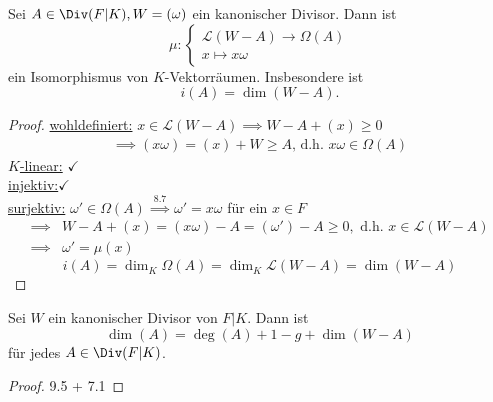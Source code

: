 \begin{satz}
    Sei $A \in \Div(F|K), W = (\omega)$ ein kanonischer Divisor.
    Dann ist
    $$ \mu: \begin{cases}
        \mathcal{L}(W-A) \to \Omega(A)\\
        x \mapsto x\omega
    \end{cases}$$
    ein Isomorphismus von $K$-Vektorräumen.
    Insbesondere ist $$i(A) = \dim (W-A).$$
\end{satz}
\begin{proof}
    \underline{wohldefiniert:} $x \in \mathcal{L}(W-A) \implies W-A + (x) \geq 0$
    \begin{align*}
        \implies (x\omega) = (x) + W \geq A \text{, d.h. } x\omega\in\Omega(A)
    \end{align*}
    \underline{$K$-linear:} $\checkmark$\\
    \underline{injektiv:}$\checkmark$\\
    \underline{surjektiv:} $\omega'\in\Omega(A) \stackrel{8.7}{\implies} \omega'=x\omega$ für ein $x \in F$
    \begin{align*}
        \implies& W-A + (x) = (x\omega) - A = (\omega') -A \geq 0, \text{ d.h. } x \in \mathcal{L}(W-A)\\
        \implies& \omega' = \mu(x)
    \end{align*}
    $$ i(A) = \dim_K\Omega(A) = \dim_K \mathcal{L}(W-A) = \dim (W-A)$$
\end{proof}

\begin{theorem}
    Sei $W$ ein kanonischer Divisor von $F|K$. Dann ist
    $$ \dim (A) = \deg (A) + 1 - g + \dim (W-A)$$
    für jedes $A \in \Div(F|K)$.
\end{theorem}
\begin{proof}
    9.5 + 7.1
\end{proof}

